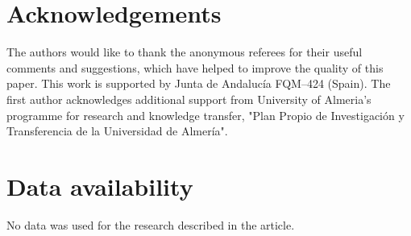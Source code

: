 \documentclass[preprint,12pt]{elsarticle}
\begin{document}
	\section*{Acknowledgements}
	The authors would like to thank the anonymous referees for their useful comments and suggestions, which have helped to improve the quality of this paper. This work is supported by Junta de Andaluc\'ia FQM--424 (Spain). The first author acknowledges additional support from University of Almeria's programme for research and knowledge transfer, "Plan Propio de Investigaci\'on y Transferencia de la Universidad de
	Almer\'ia".
		
		\section*{Data availability}
		No data was used for the research described in the article.
		
\end{document}
